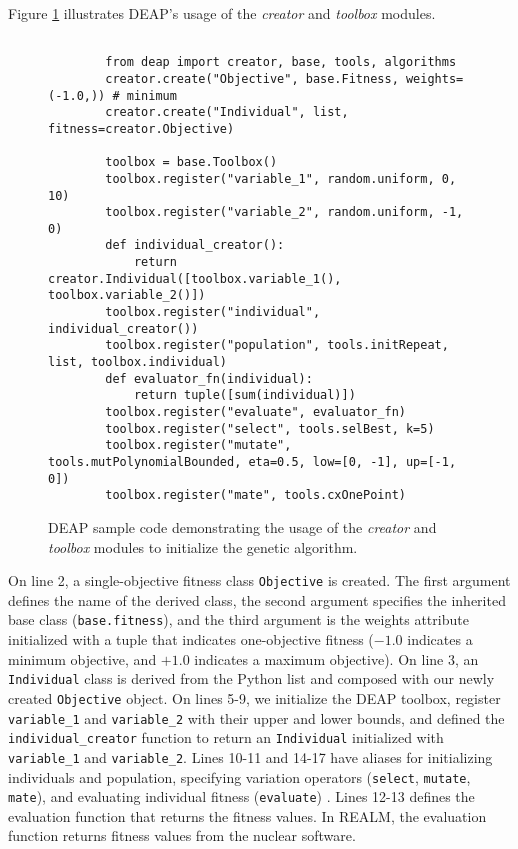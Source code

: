 Figure \ref{fig:deap-code} illustrates DEAP's usage of the \textit{creator} and
\textit{toolbox} modules. 
\begin{figure}[]
    \begin{verbatim}
        
        from deap import creator, base, tools, algorithms
        creator.create("Objective", base.Fitness, weights=(-1.0,)) # minimum
        creator.create("Individual", list, fitness=creator.Objective)

        toolbox = base.Toolbox()
        toolbox.register("variable_1", random.uniform, 0, 10)
        toolbox.register("variable_2", random.uniform, -1, 0)
        def individual_creator():
            return creator.Individual([toolbox.variable_1(), toolbox.variable_2()])
        toolbox.register("individual", individual_creator())
        toolbox.register("population", tools.initRepeat, list, toolbox.individual)
        def evaluator_fn(individual):
            return tuple([sum(individual)])
        toolbox.register("evaluate", evaluator_fn)
        toolbox.register("select", tools.selBest, k=5)
        toolbox.register("mutate", tools.mutPolynomialBounded, eta=0.5, low=[0, -1], up=[-1, 0])
        toolbox.register("mate", tools.cxOnePoint)
    \end{verbatim}
    \caption{DEAP sample code demonstrating the usage of the \textit{creator} and
    \textit{toolbox} modules to initialize the genetic algorithm.}
    \label{fig:deap-code}
\end{figure}
On line 2, a single-objective fitness class \texttt{Objective} is created. 
The first argument defines the name of the derived class, the second argument 
specifies the inherited base class (\texttt{base.fitness}), and the third 
argument is the weights attribute initialized with a tuple that indicates
one-objective fitness ($-1.0$ indicates a minimum objective, and $+1.0$ 
indicates a maximum objective). 
On line 3, an \texttt{Individual} class is derived from the Python list and 
composed with our newly created \texttt{Objective} object. 
On lines 5-9, we initialize the \gls{DEAP} toolbox, register 
\texttt{variable\_1} and \texttt{variable\_2} with their upper and lower bounds, 
and defined the \texttt{individual\_creator} function to return an 
\texttt{Individual} initialized with \texttt{variable\_1} and \texttt{variable\_2}. 
Lines 10-11 and 14-17 have aliases for initializing individuals and population, 
specifying variation operators (\texttt{select}, \texttt{mutate}, \texttt{mate}), 
and evaluating individual fitness (\texttt{evaluate}) \cite{fortin_deap_2012}. 
Lines 12-13 defines the evaluation function that returns the fitness values. 
In \gls{REALM}, the evaluation function returns fitness values from the nuclear 
software.  

